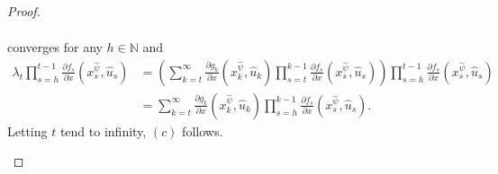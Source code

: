 \documentclass[10pt,a4paper]{amsart}
\newcommand{\natu}{\mathbb N}
\begin{document}
\begin{proof}
\begin{enumerate}
\begin{align*}
			\end{align*}
			converges for any $h\in\natu$ and
			\begin{align*}
			\lambda_t \prod_{s=h}^{t-1}\frac{\partial f_s}{\partial x}(x_s^{\hat\psi},\hat u_s)&=\left( \sum_{k=t}^\infty\frac{\partial g_k}{\partial x}(x_k^{\hat{\psi}},\hat u_k)\prod_{s=t}^{k-1}\frac{\partial f_s}{\partial x}(x_s^{\hat{\psi}},\hat u_s)\right)  \prod_{s=h}^{t-1}\frac{\partial f_s}{\partial x}(x_s^{\hat\psi},\hat u_s)\\
			&=\sum_{k=t}^\infty\frac{\partial g_k}{\partial x}(x_k^{\hat{\psi}},\hat u_k)\prod_{s=h}^{k-1}\frac{\partial f_s}{\partial x}(x_s^{\hat{\psi}},\hat u_s).
			\end{align*}
			Letting $t$ tend to infinity, $(c)$ follows.
		\end{enumerate}
	\end{proof}
\end{document}

